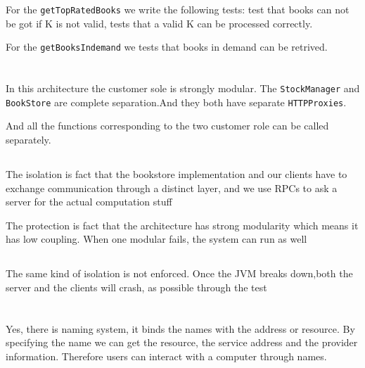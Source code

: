 \documentclass[11pt]{article}
\begin{document}
For the \texttt{getTopRatedBooks} we write the following tests: test that books can not be got if K is not valid, tests that a valid K can be processed correctly.

For the \texttt{getBooksIndemand} we tests that books in demand can be retrived.

\section{}
\subsection{}
In this architecture the customer sole is strongly modular. The \texttt{StockManager} and \texttt{BookStore} are complete separation.And they both have separate \texttt{HTTPProxies}. 

And all the functions corresponding to the two customer role can be called separately.


\subsection{}
The isolation is fact that the bookstore implementation and our clients have to exchange communication through a distinct layer, and we use RPCs to ask a server for the actual computation stuff

The protection is fact that the architecture has strong modularity which means it has low coupling. When one modular fails, the system can run as well

\subsection{}
The same kind of isolation is not enforced. Once the JVM breaks down,both the server and the clients will crash, as possible through the test


\section{}
\subsection{}
Yes, there is naming system, it binds the names with the address or resource. By specifying the name  we can get the resource, the service address and the provider information. Therefore users can interact with a computer through names.
\end{document}
